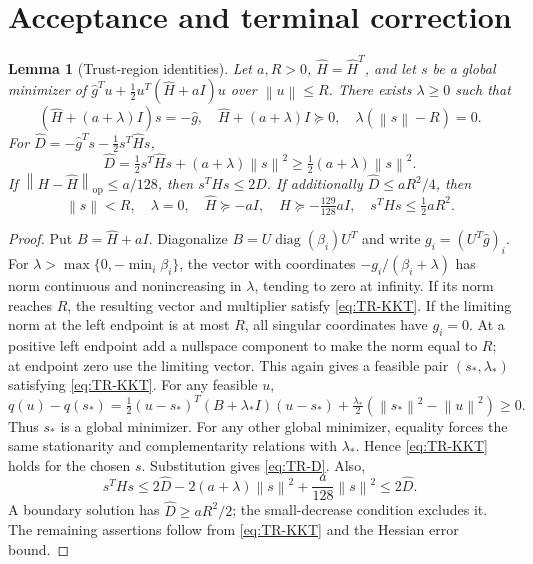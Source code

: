 \documentclass[11pt]{article}
\numberwithin{equation}{section}
\newtheorem{lemma}[assumption]{Lemma}
\newcommand{\norm}[1]{\left\lVert#1\right\rVert}
\newcommand{\op}{\mathrm{op}}
\DeclareMathOperator{\diag}{diag}
\begin{document}
\section{Acceptance and terminal correction}

\begin{lemma}[Trust-region identities]\label{lem:TR}
Let $a,R>0$, $\widehat H=\widehat H^T$, and let $s$ be a global
minimizer of $\widehat g^Tu+\tfrac12u^T(\widehat H+aI)u$ over
$\norm u\le R$. There exists $\lambda\ge0$ such that
\begin{equation}\label{eq:TR-KKT}
 (\widehat H+(a+\lambda)I)s=-\widehat g,
 \quad\widehat H+(a+\lambda)I\succeq0,
 \quad\lambda(\norm s-R)=0.
\end{equation}
For $\widehat D=-\widehat g^Ts-\tfrac12s^T\widehat Hs$,
\begin{equation}\label{eq:TR-D}
 \widehat D=\tfrac12s^T\widehat Hs+(a+\lambda)\norm s^2
 \ge\tfrac12(a+\lambda)\norm s^2.
\end{equation}
If $\norm{H-\widehat H}_{\op}\le a/128$, then
$s^THs\le2\widehat D$.
If additionally $\widehat D\le aR^2/4$, then
\begin{equation}\label{eq:TR-small}
 \norm s<R,\quad\lambda=0,\quad
 \widehat H\succeq-aI,\quad
 H\succeq-\tfrac{129}{128}aI,\quad
 s^THs\le\tfrac12aR^2.
\end{equation}
\end{lemma}

\begin{proof}
Put $B=\widehat H+aI$. Diagonalize $B=U\diag(\beta_i)U^T$ and
write $g_i=(U^T\widehat g)_i$.
For $\lambda>\max\{0,-\min_i\beta_i\}$, the vector with coordinates
$-g_i/(\beta_i+\lambda)$ has norm continuous and nonincreasing in
$\lambda$, tending to zero at infinity.
If its norm reaches $R$, the resulting vector and multiplier satisfy
\eqref{eq:TR-KKT}. If the limiting norm at the left endpoint is at
most $R$, all singular coordinates have $g_i=0$. At a positive
left endpoint add a nullspace component to make the norm equal to
$R$; at endpoint zero use the limiting vector. This again gives a
feasible pair $(s_*,\lambda_*)$ satisfying \eqref{eq:TR-KKT}.
For any feasible $u$,
\[
 q(u)-q(s_*)
 =\tfrac12(u-s_*)^T(B+\lambda_*I)(u-s_*)
  +\tfrac{\lambda_*}{2}(\norm{s_*}^2-\norm u^2)\ge0.
\]
Thus $s_*$ is a global minimizer. For any other global minimizer,
equality forces the same stationarity and complementarity relations
with $\lambda_*$. Hence \eqref{eq:TR-KKT} holds for the chosen $s$.
Substitution gives \eqref{eq:TR-D}.
Also,
\[
 s^THs\le2\widehat D-2(a+\lambda)\norm s^2
                         +\frac a{128}\norm s^2
 \le2\widehat D.
\]
A boundary solution has $\widehat D\ge aR^2/2$; the small-decrease
condition excludes it. The remaining assertions follow from
\eqref{eq:TR-KKT} and the Hessian error bound.
\end{proof}
\end{document}
